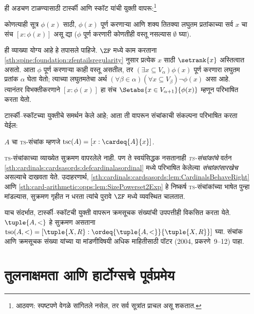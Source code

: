 ही अडचण टाळण्यासाठी टार्स्की आणि स्कॉट यांची युक्ती वापरू:\footnote{आठवण: स्पष्टपणे वेगळे सांगितले नसेल, तर सर्व सूत्रांत प्राचल असू शकतात.}

\begin{defn}[टार्स्की--स्कॉट]
कोणत्याही सूत्र $\phi(x)$ साठी, $\phi(x)$ पूर्ण करणाऱ्या आणि शक्य तितक्या लघुतम प्रतांकाच्या सर्व $x$ चा संच $[ x : \phi(x)] $ असू द्या ($\phi$ पूर्ण करणारी कोणतीही वस्तू नसल्यास $\emptyset$ घ्या).
\end{defn}

ही व्याख्या योग्य आहे हे तपासले पाहिजे. $\ZF$ मध्ये काम करताना \ref{sth:spine:foundation:zfentailsregularity} नुसार प्रत्येक $x$ साठी $\setrank{x}$ अस्तित्वात असतो. आता $\phi$ पूर्ण करणाऱ्या काही वस्तू असतील, तर $(\exists x\subseteq V_\alpha)\phi(x)$ पूर्ण करणारा लघुतम प्रतांक $\alpha$ घेता येतो; त्याच्या लघुतमतेचा अर्थ $(\forall \beta
\in \alpha)(\forall x \subseteq V_\beta)\lnot \phi(x)$ असा आहे. त्यानंतर विभक्तीकरणाने $[x : \phi(x)]$ हा संच $\Setabs{x \in
V_{\alpha+1}}{\phi(x)}$ म्हणून परिभाषित करता येतो.

टार्स्की--स्कॉटच्या युक्तीचे समर्थन केले आहे; आता ती वापरून संचांकाची संकल्पना परिभाषित करता येईल:

\begin{defn}
$A$ चा \textsc{ts}-संचांक म्हणजे $\text{tsc}(A) = [x :
\cardeq{A}{x}]$.
\end{defn}

\textsc{ts}-संचांकाच्या व्याख्येत सुक्रमण वापरलेले नाही. पण ते स्वयंसिद्धक नसतानाही \emph{\textsc{ts}-संचांकांचे} वर्तन \ref{sth:cardinals:cardsasords:defcardinalasordinal} मध्ये परिभाषित केलेल्या \emph{संचांकांसारखेच} असल्याचे दाखवता येते. उदाहरणार्थ, \ref{sth:cardinals:cardsasords:lem:CardinalsBehaveRight} आणि \ref{sth:card-arithmetic:opps:lem:SizePowerset2Exp} हे निष्कर्ष \textsc{ts}-संचांकांच्या भाषेत पुन्हा मांडल्यास, सुक्रमण गृहीत न धरता त्यांचे पुरावे $\ZF$ मध्ये व्यवस्थित चालतात.

याच संदर्भात, टार्स्की--स्कॉटची युक्ती वापरून क्रमसूचक संख्यांची उपपत्तीही विकसित करता येते. $\tuple{A, <}$ हे सुक्रमण असताना $\text{tso}(A, <) = [\tuple{X,
R} : \ordeq{\tuple{A, <}}{\tuple{X, R}}]$ घ्या. संचांक आणि क्रमसूचक संख्या यांच्या या मांडणीविषयी अधिक माहितीसाठी पॉटर (2004, प्रकरणे~9--12) पाहा.







\section{तुलनाक्षमता आणि हार्टोग्सचे पूर्वप्रमेय}\label{sth:choice:hartogs:sec}

